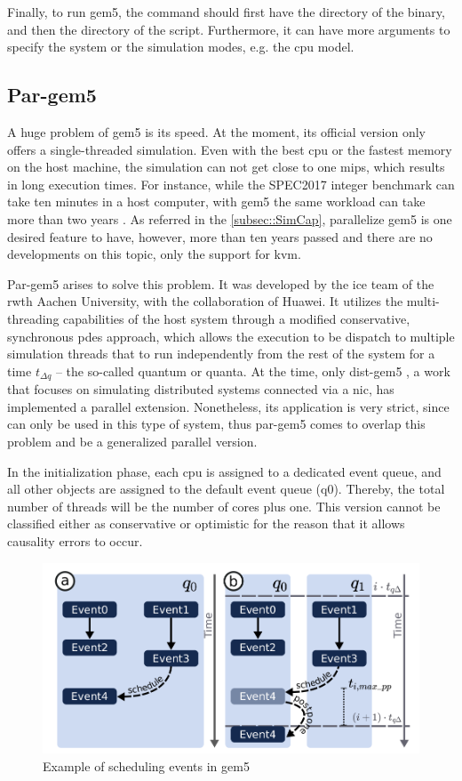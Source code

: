 Finally, to run gem5, the command should first have the directory of the binary, and then the directory of the script. Furthermore, it can have more arguments to specify the system or the simulation modes, e.g. the \gls{cpu} model.

\subsection{Par-gem5}
\label{subsec:pargem5}

A huge problem of gem5 is its speed. At the moment, its official version only offers a single-threaded simulation. Even with the best \gls{cpu} or the fastest memory on the host machine, the simulation can not get close to one \gls{mips}, which results in long execution times. For instance, while the SPEC2017 integer benchmark can take ten minutes in a host computer, with gem5 the same workload can take more than two years \cite{pargem5}. As referred in the \autoref{subsec::SimCap}, parallelize gem5 is one desired feature to have, however, more than ten years passed and there are no developments on this topic, only the support for \gls{kvm}. 

Par-gem5 \cite{pargem5} arises to solve this problem. It was developed by the \gls{ice} team of the \gls{rwth} Aachen University, with the collaboration of Huawei. It utilizes the multi-threading capabilities of the host system through a modified conservative, synchronous \gls{pdes} approach, which allows the execution to be dispatch to multiple simulation threads that to run independently from the rest of the system for a time $t_{\Delta q}$ – the so-called quantum or quanta. At the time, only dist-gem5 \cite{dist-gem5}, a work that focuses on simulating distributed systems connected via a \gls{nic}, has implemented a parallel extension. Nonetheless, its application is very strict, since can only be used in this type of system, thus par-gem5 comes to overlap this problem and be a generalized parallel version.

In the initialization phase, each \gls{cpu} is assigned to a dedicated event queue, and all other objects are assigned to the default event queue (q0). Thereby, the total number of threads will be the number of cores plus one. This version cannot be classified either as conservative or optimistic for the reason that it allows causality errors to occur.

\begin{figure}[H]
	\centering
 	\includegraphics[width=0.7\linewidth]{Images/SchedulingEventGem5.png}
 	\caption{Example of scheduling events in gem5 \cite{pargem5}}
	 \label{fig_SchedulingEventGem5}
\end{figure}

